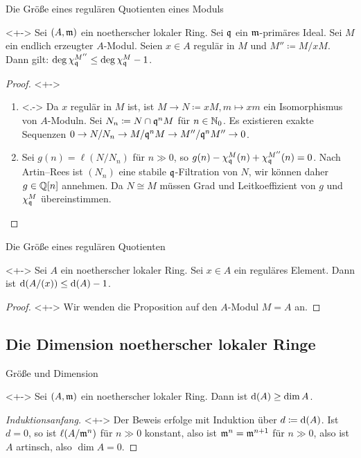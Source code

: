 \begin{frame}{Die Größe eines regulären Quotienten eines Moduls}
	\begin{proposition}<+->
		Sei \((A, \mathfrak{m})\) ein noetherscher lokaler Ring. Sei \(\mathfrak{q}\) ein \(\mathfrak{m}\)-primäres
		Ideal. Sei \(M\) ein endlich erzeugter \(A\)-Modul. Seien \(x \in A\) regulär in \(M\) und
		\(M'' \coloneqq M/xM\). Dann gilt: \(\deg \chi_{\mathfrak{q}}^{M''} \leq  \deg \chi_{\mathfrak{q}}^M - 1\).
	\end{proposition}
	\begin{proof}<+->
		\begin{enumerate}[<+->]
		\item<.->
			Da \(x\) regulär in \(M\) ist, ist \(M \to N \coloneqq x M, m \mapsto x m\) ein Isomorphismus von
			\(A\)-Moduln. Sei \(N_n \coloneqq N \cap \mathfrak{q}^n M\) für \(n \in \mathbb N_0\). Es existieren exakte Sequenzen
			\(0 \to N/N_n \to M/\mathfrak{q}^n M \to M''/\mathfrak{q}^n M'' \to 0\).
		\item
			Sei \(g(n) = \ell(N/N_n)\) für \(n \gg 0\), so \(g(n) - \chi_{\mathfrak{q}}^M(n) + \chi_{\mathfrak{q}}^{M''}(n) = 0\).
			Nach Artin--Rees ist \((N_n)\) eine stabile \(\mathfrak{q}\)-Filtration von \(N\), wir können daher
			\(g \in \mathbb Q[n]\) annehmen.
			Da \(N \cong M\) müssen Grad und Leitkoeffizient von \(g\) und \(\chi_{\mathfrak{q}}^M\) übereinstimmen.
			\qedhere
		\end{enumerate}
	\end{proof}
\end{frame}

\begin{frame}{Die Größe eines regulären Quotienten}
	\begin{corollary}<+->
		Sei \(A\) ein noetherscher lokaler Ring. Sei \(x \in A\) ein reguläres Element. Dann ist
		\(\operatorname{d}(A/(x)) \le \operatorname{d}(A) - 1\).
	\end{corollary}
	\begin{proof}<+->
		Wir wenden die Proposition auf den \(A\)-Modul \(M = A\) an.
	\end{proof}
\end{frame}

\subsection{Die Dimension noetherscher lokaler Ringe}

\begin{frame}{Größe und Dimension}
	\begin{proposition}<+->
		Sei \((A, \mathfrak{m})\) ein noetherscher lokaler Ring. Dann ist \(\operatorname{d}(A) \ge \dim A\).
	\end{proposition}
	\begin{proof}[Induktionsanfang]<+->
		Der Beweis erfolge mit Induktion über \(d \coloneqq \operatorname{d}(A)\). Ist \(d = 0\), so ist
		\(\ell(A/\mathfrak{m}^n)\) für \(n \gg 0\) konstant, also ist \(\mathfrak{m}^n = \mathfrak{m}^{n + 1}\) für
		\(n \gg 0\), also ist \(A\) artinsch, also \(\dim A = 0\).
		\renewcommand{\qedsymbol}{}
	\end{proof}
\end{frame}

